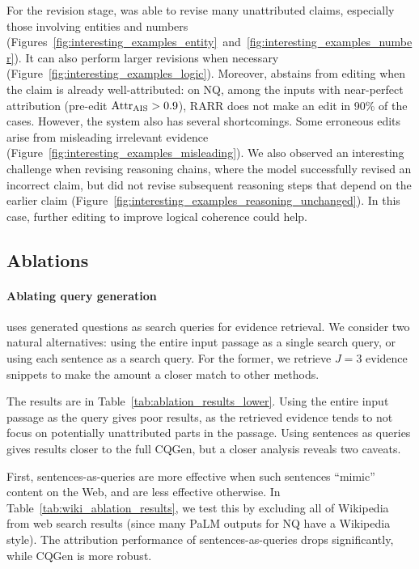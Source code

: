 For the revision stage,
\approach{} was able to revise many unattributed claims, especially those involving entities and numbers (Figures~\ref{fig:interesting_examples_entity}~and~\ref{fig:interesting_examples_number}).
It can also perform larger revisions when necessary (Figure~\ref{fig:interesting_examples_logic}).
Moreover, \approach{} abstains from editing when the claim is already well-attributed:
on NQ, among the inputs with near-perfect attribution (pre-edit $\text{Attr}_\text{AIS}{} > 0.9$), RARR does not make an edit in 90\% of the cases.
However, the system also has several shortcomings.
Some erroneous edits arise from %
misleading irrelevant evidence (Figure~\ref{fig:interesting_examples_misleading}).
We also observed an interesting challenge when revising reasoning chains, %
where the model successfully revised an incorrect claim, but did not revise subsequent reasoning steps that depend on the earlier claim (Figure~\ref{fig:interesting_examples_reasoning_unchanged}). In this case, further editing to improve logical coherence could help.

\subsection{Ablations} \label{sec:ablations}




\paragraph{Ablating query generation}
\approach{} uses generated questions as search queries for evidence retrieval. We consider two natural alternatives: using the entire input passage as a single search query, or using each sentence as a search query.
For the former, we retrieve $J = 3$ evidence snippets to make the amount a closer match to other methods.

The results are in Table~\ref{tab:ablation_results_lower}.
Using the entire input passage as the query gives poor results,
as the retrieved evidence tends to not focus on potentially unattributed parts in the passage.
Using sentences as queries gives results closer to the full CQGen, but a closer analysis reveals two caveats.



First, sentences-as-queries are more effective when such sentences ``mimic'' content on the Web,
and are less effective otherwise.
In Table~\ref{tab:wiki_ablation_results}, we test this by excluding all of Wikipedia from web search results (since many PaLM outputs for NQ have a Wikipedia style). The attribution performance of sentences-as-queries drops significantly, while CQGen is more robust.

